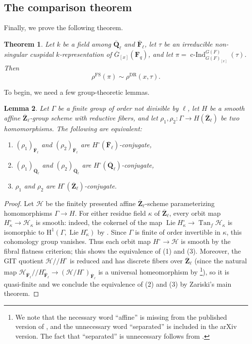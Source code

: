 \documentclass[reqno]{amsart}
\numberwithin{equation}{subsection}
\newcommand{\F}{\mathbf{F}}
\newcommand{\Q}{\mathbf{Q}}
\newcommand{\Z}{\mathbf{Z}}
\newcommand{\ol}[1]{\overline{#1}}
\newcommand\sH{\mathscr{H}}
\DeclareMathOperator{\FS}{FS}
\DeclareMathOperator{\cInd}{c-Ind}
\DeclareMathOperator{\DR}{DR}
\newcommand{\rH}{\ensuremath{\mathrm{H}}\xspace}
\newtheorem{thm}{Theorem}[subsection]
\newtheorem{lemma}[thm]{Lemma}
\theoremstyle{remark}
\numberwithin{equation}{subsection}
\numberwithin{figure}{subsection}
\begin{document}
\subsection{The comparison theorem}

Finally, we prove the following theorem.

\begin{thm}\label{thm:main-depth-0-comparison}
    Let $k$ be a field among $\ol\Q_\ell$ and $\ol\F_\ell$, let $\tau$ be an irreducible non-singular cuspidal $k$-representation of $\ol G_{[x]}(\F_q)$, and let $\pi = \cInd_{G(F)_{[x]}}^{G(F)}(\tau)$. Then
    \[
    \rho^{\FS}(\pi) \sim \rho^{\DR}(x,\tau).
    \]
\end{thm}

To begin, we need a few group-theoretic lemmas.

\begin{lemma}\label{lemma:finite-groups-mod-ell}
    Let $\Gamma$ be a finite group of order not divisible by $\ell$, let $H$ be a smooth affine $\ol{\Z}_\ell$-group scheme with reductive fibers, and let $\rho_1, \rho_2\colon \Gamma \to H(\ol{\Z}_\ell)$ be two homomorphisms. The following are equivalent:
    \begin{enumerate}
        \item $(\rho_1)_{\ol{\F}_\ell}$ and $(\rho_2)_{\ol{\F}_\ell}$ are $H^\circ({\ol{\F}_\ell})$-conjugate,
        \item $(\rho_1)_{\ol{\Q}_\ell}$ and $(\rho_2)_{\ol{\Q}_\ell}$ are $H^\circ(\ol{\Q}_\ell)$-conjugate,
        \item $\rho_1$ and $\rho_2$ are $H^\circ(\ol{\Z}_\ell)$-conjugate.
    \end{enumerate}
\end{lemma}

\begin{proof}
    Let $\sH$ be the finitely presented affine $\ol{\Z}_\ell$-scheme parameterizing homomorphisms $\Gamma \to H$. For either residue field $\kappa$ of $\ol{\Z}_\ell$, every orbit map $H^\circ_\kappa \to \sH_\kappa$ is smooth: indeed, the cokernel of the map $\operatorname{Lie} H^\circ_\kappa \to \operatorname{Tan}_f \sH_\kappa$ is isomorphic to $\rH^1(\Gamma, \operatorname{Lie} H^\circ_\kappa)$ by \cite[Expos\'e III, 2.1(ii), 2.3]{SGA3I}. Since $\Gamma$ is finite of order invertible in $\kappa$, this cohomology group vanishes. Thus each orbit map $H^\circ \to \sH$ is smooth by the fibral flatness criterion; this shows the equivalence of (1) and (3). Moreover, the GIT quotient $\sH/\!/H^\circ$ is reduced and has discrete fibers over $\ol{\Z}_\ell$ (since the natural map $\sH_{\ol\F_\ell}/\!/H^\circ_{\ol\F_\ell} \to (\sH/H^\circ)_{\ol\F_\ell}$ is a universal homeomorphism by \cite[Proposition~5.2.9(3), Theorem~9.1.4, Theorem~9.7.5]{Alp14}\footnote{We note that the necessary word ``affine'' is missing from the published version of \cite[Theorem~9.7.5]{Alp14}, and the unnecessary word ``separated'' is included in the arXiv version. The fact that ``separated'' is unnecessary follows from \cite[Proposition~3.1.3]{Con14}.}), so it is quasi-finite and we conclude the equivalence of (2) and (3) by Zariski's main theorem.
\end{proof}
\end{document}
